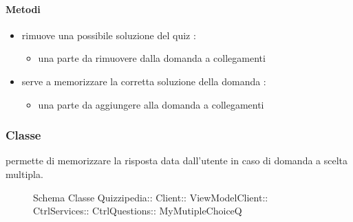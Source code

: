 \paragraph{Metodi}
\begin{itemize}
\item {}
\newline
rimuove una possibile soluzione del quiz
\newline
{} :
\begin{itemize}
\item {}
\newline
una parte da rimuovere dalla domanda a collegamenti
\end{itemize}
\item {}
\newline
serve a memorizzare la corretta soluzione della domanda
\newline
{} :
\begin{itemize}
\item {}
\newline
una parte da aggiungere alla domanda a collegamenti
\end{itemize}
\end{itemize}
\subsubsection{Classe }
permette di memorizzare la risposta data dall'utente in caso di domanda a scelta multipla.
\begin{figure}[H]
\centering
\noindent{}
\caption[Schema Classe MyMutipleChoiceQ]{Schema Classe Quizzipedia:: Client:: ViewModelClient:: CtrlServices:: CtrlQuestions:: MyMutipleChoiceQ}
\end{figure}
